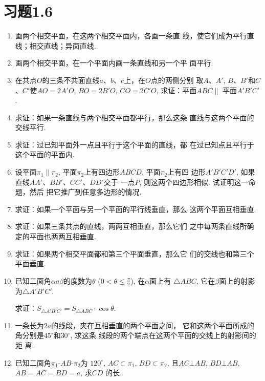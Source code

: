 \section*{习题1.6}
\begin{enumerate}
  \item 画两个相交平面，在这两个相交平面内，各画一条直
  线，使它们成为平行直线；相交直线；异面直线. 
  \item 画两个相交平面，在一个平面内画一条直线和另一个平
  面平行. 
  \item 在共点$O$的三条不共面直线$a$、$b$、$c$上，在$O$点的两侧分别
  取$A$、$A'$, $B$、$B'$和$C$、$C'$使$AO=2A'O$, $BO=2B'O$, 
  $CO=2C'O$, 求证：平面$ABC\parallel$ 平面$A'B'C'$.
  \item 求证：如果一条直线与两个相交平面都平行，那么这条
  直线与这两个平面的交线平行. 
  \item 求证：过已知平面外一点且平行于这个平面的直线，都
  在过已知点且平行于这个平面的平面内. 
  \item 设平面$\pi_1\parallel \pi_2$, 平面$\pi_2$上有四边形$ABCD$, 平面$\pi_2$上有四
  边形$A'B'C'D'$, 如果直线$AA'$、$BB'$、$CC'$、$DD'$交于
  一点$P$, 则这两个四边形相似. 试证明这一命题，然后
  把它推广到任意多边形的情况. 
  \item 求证：如果一个平面与另一个平面的平行线垂直，那么
  这两个平面互相垂直. 
  \item 求证：如果三条共点的直线，两两互相垂直，那么它们
  之中每两条直线所确定的平面也两两互相垂直. 
  \item 求证：如果两个相交平面都和第三个平面垂直，那么它
  们的交线也和第三个平面垂直. 
  \item 已知二面角$\alpha a\beta$的度数为$\theta$ ($0<\theta\le \frac{\pi}{2}$), 
  在$\alpha$面上有
  $\triangle ABC$, 它在$\beta$面上的射影为$\triangle A'B'C'$. 

  求证：$S_{\triangle A'B'C'}=S_{\triangle ABC}\cdot \cos\theta$.
  \item 一条长为$2a$的线段，夹在互相垂直的两个平面之间，
  它和这两个平面所成的角分别是$45^{\circ}$和$30^{\circ}$, 求这条
  线段的两个端点在这两个平面的交线上的射影间的距
  离. 
\item 已知二面角$\pi_1$-$AB$-$\pi_2$为
$120^{\circ}$, $AC\subset \pi_1$, $BD\subset \pi_2$, 
且$AC\bot AB$, $BD\bot AB$, 
$AB=AC=BD=a$, 求$CD$
的长. 

\begin{figure}[htp]
  \centering
{}
\end{figure}
\end{enumerate}
